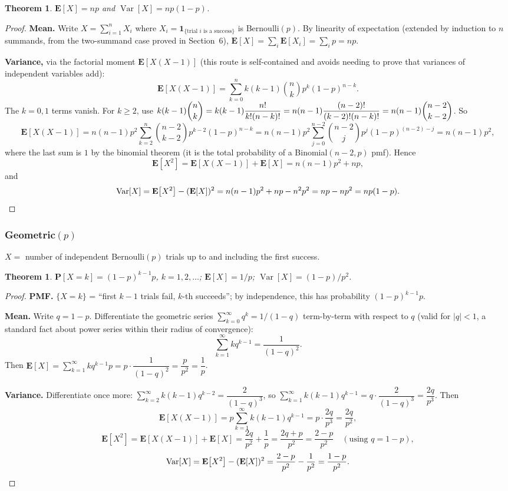 \documentclass[11pt]{article}
\theoremstyle{definition}
\theoremstyle{plain}
\newtheorem{theorem}[definition]{Theorem}
\theoremstyle{remark}
\newcommand{\E}[1]{\mathbf{E}\!\left[#1\right]}
\newcommand{\Var}[1]{\operatorname{Var}\!\left[#1\right]}
\begin{document}
\begin{theorem}
$\E{X}=np$ and $\Var{X}=np(1-p)$.
\end{theorem}
\begin{proof}
\textbf{Mean.} Write $X = \sum_{i=1}^n X_i$ where $X_i = \mathbf{1}_{\{\text{trial } i \text{ is a
success}\}}$ is Bernoulli$(p)$. By linearity of expectation (extended by induction to $n$
summands, from the two-summand case proved in Section~6),
$\E{X} = \sum_i \E{X_i} = \sum_i p = np$.

\textbf{Variance,} via the factorial moment $\E{X(X-1)}$ (this route is self-contained and avoids
needing to prove that variances of independent variables add):
\[
\E{X(X-1)} = \sum_{k=0}^n k(k-1)\binom{n}{k}p^k(1-p)^{n-k}.
\]
The $k=0,1$ terms vanish. For $k\ge 2$, use
$k(k-1)\dbinom{n}{k} = k(k-1)\dfrac{n!}{k!(n-k)!} = n(n-1)\dfrac{(n-2)!}{(k-2)!(n-k)!}
= n(n-1)\dbinom{n-2}{k-2}$. So
\[
\E{X(X-1)} = n(n-1)p^2\sum_{k=2}^n \binom{n-2}{k-2}p^{k-2}(1-p)^{n-k}
= n(n-1)p^2 \sum_{j=0}^{n-2}\binom{n-2}{j}p^j(1-p)^{(n-2)-j} = n(n-1)p^2,
\]
where the last sum is $1$ by the binomial theorem (it is the total probability of a Binomial$(n-2,p)$
pmf). Hence
\[
\E{X^2} = \E{X(X-1)}+\E{X} = n(n-1)p^2+np,
\]
and
\[
\Var{X} = \E{X^2}-(\E{X})^2 = n(n-1)p^2+np - n^2p^2 = np - np^2 = np(1-p). \qedhere
\]
\end{proof}

\subsubsection{Geometric$(p)$}

$X=$ number of independent Bernoulli$(p)$ trials up to and including the first success.

\begin{theorem}
$\mathbf{P}[X=k]=(1-p)^{k-1}p$, $k=1,2,\dots$; $\E{X}=1/p$; $\Var{X}=(1-p)/p^2$.
\end{theorem}
\begin{proof}
\textbf{PMF.} $\{X=k\}$ = ``first $k-1$ trials fail, $k$-th succeeds''; by independence, this has
probability $(1-p)^{k-1}p$.

\textbf{Mean.} Write $q=1-p$. Differentiate the geometric series $\sum_{k=0}^\infty q^k = 1/(1-q)$
term-by-term with respect to $q$ (valid for $|q|<1$, a standard fact about power series within
their radius of convergence):
\[
\sum_{k=1}^\infty k q^{k-1} = \frac{1}{(1-q)^2}.
\]
Then $\E{X} = \sum_{k=1}^\infty k q^{k-1}p = p\cdot\dfrac{1}{(1-q)^2} = \dfrac{p}{p^2}=\dfrac1p$.

\textbf{Variance.} Differentiate once more: $\sum_{k=2}^\infty k(k-1)q^{k-2} = \dfrac{2}{(1-q)^3}$,
so $\sum_{k=1}^\infty k(k-1)q^{k-1} = q\cdot\dfrac{2}{(1-q)^3} = \dfrac{2q}{p^3}$. Then
\[
\E{X(X-1)} = p\sum_{k=1}^\infty k(k-1)q^{k-1} = p\cdot\frac{2q}{p^3} = \frac{2q}{p^2},
\]
\[
\E{X^2} = \E{X(X-1)}+\E{X} = \frac{2q}{p^2}+\frac1p = \frac{2q+p}{p^2} = \frac{2-p}{p^2}
\quad(\text{using } q=1-p),
\]
\[
\Var{X} = \E{X^2}-(\E{X})^2 = \frac{2-p}{p^2}-\frac{1}{p^2} = \frac{1-p}{p^2}. \qedhere
\]
\end{proof}
\end{document}
